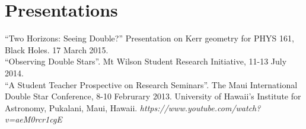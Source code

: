 \section{Presentations}

``Two Horizons: Seeing Double?'' Presentation on Kerr geometry for PHYS 161, Black Holes. 17 March 2015.\\
``Observing Double Stars''. Mt Wilson Student Research Initiative, 11-13 July 2014.\\
``A Student Teacher Prospective on Research Seminars''. The Maui International Double Star Conference, 8-10 Februrary 2013. University of Hawaii’s Institute for Astronomy, Pukalani, Maui, Hawaii.
{\sl https://www.youtube.com/watch?v=aeM0rcr1cgE }
